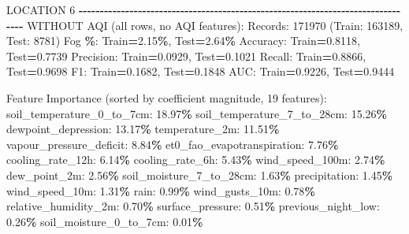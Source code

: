 \documentclass[
  letterpaper,
  DIV=11,
  numbers=noendperiod]{scrartcl}
\newenvironment{Shaded}{\begin{snugshade}}{\end{snugshade}}
\newcommand{\BuiltInTok}[1]{#1}
\newcommand{\DecValTok}[1]{\textcolor[rgb]{0.00,0.00,0.81}{#1}}
\newcommand{\FloatTok}[1]{\textcolor[rgb]{0.00,0.00,0.81}{#1}}
\newcommand{\NormalTok}[1]{#1}
\newcommand{\OperatorTok}[1]{\textcolor[rgb]{0.81,0.36,0.00}{\textbf{#1}}}
\begin{document}
\begin{Shaded}
\begin{Highlighting}[]
\NormalTok{LOCATION }\DecValTok{6}
\OperatorTok{{-}{-}{-}{-}{-}{-}{-}{-}{-}{-}{-}{-}{-}{-}{-}{-}{-}{-}{-}{-}{-}{-}{-}{-}{-}{-}{-}{-}{-}{-}{-}{-}{-}{-}{-}{-}{-}{-}{-}{-}{-}{-}{-}{-}{-}{-}{-}{-}{-}{-}{-}{-}{-}{-}{-}{-}{-}{-}{-}{-}{-}{-}{-}{-}{-}{-}{-}{-}{-}{-}{-}{-}{-}{-}{-}{-}{-}{-}{-}{-}}
\NormalTok{WITHOUT AQI (}\BuiltInTok{all}\NormalTok{ rows, no AQI features):}
\NormalTok{  Records: }\DecValTok{171970}\NormalTok{ (Train: }\DecValTok{163189}\NormalTok{, Test: }\DecValTok{8781}\NormalTok{)}
\NormalTok{  Fog }\OperatorTok{\%}\NormalTok{: Train}\OperatorTok{=}\FloatTok{2.15}\OperatorTok{\%}\NormalTok{, Test}\OperatorTok{=}\FloatTok{2.64}\OperatorTok{\%}
\NormalTok{  Accuracy: Train}\OperatorTok{=}\FloatTok{0.8118}\NormalTok{, Test}\OperatorTok{=}\FloatTok{0.7739}
\NormalTok{  Precision: Train}\OperatorTok{=}\FloatTok{0.0929}\NormalTok{, Test}\OperatorTok{=}\FloatTok{0.1021}
\NormalTok{  Recall: Train}\OperatorTok{=}\FloatTok{0.8866}\NormalTok{, Test}\OperatorTok{=}\FloatTok{0.9698}
\NormalTok{  F1: Train}\OperatorTok{=}\FloatTok{0.1682}\NormalTok{, Test}\OperatorTok{=}\FloatTok{0.1848}
\NormalTok{  AUC: Train}\OperatorTok{=}\FloatTok{0.9226}\NormalTok{, Test}\OperatorTok{=}\FloatTok{0.9444}

\NormalTok{  Feature Importance (}\BuiltInTok{sorted}\NormalTok{ by coefficient magnitude, }\DecValTok{19}\NormalTok{ features):}
\NormalTok{    soil\_temperature\_0\_to\_7cm: }\FloatTok{18.97}\OperatorTok{\%}
\NormalTok{    soil\_temperature\_7\_to\_28cm: }\FloatTok{15.26}\OperatorTok{\%}
\NormalTok{    dewpoint\_depression: }\FloatTok{13.17}\OperatorTok{\%}
\NormalTok{    temperature\_2m: }\FloatTok{11.51}\OperatorTok{\%}
\NormalTok{    vapour\_pressure\_deficit: }\FloatTok{8.84}\OperatorTok{\%}
\NormalTok{    et0\_fao\_evapotranspiration: }\FloatTok{7.76}\OperatorTok{\%}
\NormalTok{    cooling\_rate\_12h: }\FloatTok{6.14}\OperatorTok{\%}
\NormalTok{    cooling\_rate\_6h: }\FloatTok{5.43}\OperatorTok{\%}
\NormalTok{    wind\_speed\_100m: }\FloatTok{2.74}\OperatorTok{\%}
\NormalTok{    dew\_point\_2m: }\FloatTok{2.56}\OperatorTok{\%}
\NormalTok{    soil\_moisture\_7\_to\_28cm: }\FloatTok{1.63}\OperatorTok{\%}
\NormalTok{    precipitation: }\FloatTok{1.45}\OperatorTok{\%}
\NormalTok{    wind\_speed\_10m: }\FloatTok{1.31}\OperatorTok{\%}
\NormalTok{    rain: }\FloatTok{0.99}\OperatorTok{\%}
\NormalTok{    wind\_gusts\_10m: }\FloatTok{0.78}\OperatorTok{\%}
\NormalTok{    relative\_humidity\_2m: }\FloatTok{0.70}\OperatorTok{\%}
\NormalTok{    surface\_pressure: }\FloatTok{0.51}\OperatorTok{\%}
\NormalTok{    previous\_night\_low: }\FloatTok{0.26}\OperatorTok{\%}
\NormalTok{    soil\_moisture\_0\_to\_7cm: }\FloatTok{0.01}\OperatorTok{\%}


\end{Highlighting}
\end{Shaded}
\end{document}
